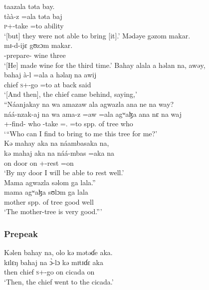  \medskip
  taazala təta  bay.\\
 \gll tàà-z     =ala  təta baj\\
 \textsc{p}+{\HOR}-take  =to      ability  {\NEG}\\
 \glt ‘[but] they were not able to bring [it].’  
 \z
\ea   Mədəye  gəzom  makar.  \\
 \gll mɪ-d-ijɛ      gʊzɔm     makar. \\
 {\NOM}{}-prepare{}-{\CL}       wine  three\\
 \glt ‘[He] made wine for the third time.’
 \z
\ea   Bahay  alala  a  həlan  na,  awəy,\\
 \gll bahaj    à-l    =ala      a   həlaŋ   na awij\\
 chief   \textsc{s}+{\PFV}-go  =to   at   back   {\PSP}  said  \\  
 \glt ‘[And then], the chief came behind, saying,’\\
 
 \medskip
  “Náanjakay  na  wa  amazaw  ala  agwazla  ana  ne  na  way?\\
 \gll náá-nzak-aj        na       wa  ama-z  =aw =ala      agʷaɮa    ana     nɛ   na  waj\\
 {\oneS}+\textsc{{\POT}}{}-find{}-{\CL}   {\PSP}   who   {\DEP}-take ={\oneS}.{\IO}  =to    {spp. of tree}     {\DAT}    {\oneS}    {\PSP}  who\\
 \glt ‘“Who can I find to bring to me this tree for me?’\\
 
 \medskip
 Kə  mahay  aka  na  náambasaka  na,\\
\gll  kə   mahaj    aka  na   náá-mbas     =aka   na\\
 on    door       on      {\PSP}   {\oneS}+{\POT}-rest    =on      {\PSP}\\
 \glt ‘By my door I will be able to rest well.’\\

 \medskip
  Mama  agwazla  səlom  ga  lala.”\\
 \gll mama    agʷaɮa       sʊlɔm   ga     lala\\
 mother   {spp. of tree}     good     {\ADJ}   well\\
 \glt ‘The mother-tree is very good.”’
 \z
 
 \subsubsection*{Prepeak}
\ea   Kəlen  bahay  na,  olo  kə  mətəɗe  aka.  \\
\gll  kɪlɛŋ bahaj  na  \`ɔ-lɔ        kə  mɪtɪɗɛ  aka \\
 then    chief  {\PSP}  \textsc{s}+{\PFV}-go    on  cicada  on\\
 \glt ‘Then, the chief went to the cicada.’  
 \z
 
